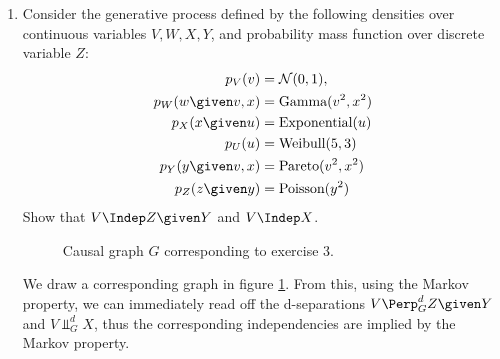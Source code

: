 \begin{enumerate}[label=6.\arabic*]
\begin{gradedsolution}
\begin{enumerate}
            \item
            In both cases, after the intervention $\doit(X=1)$, $X$ is distributed according to a delta distribution with its mass point on $X=1$. In the original Causal Bayesian Network, after intervention do$(X=1)$, the marginal distribution of $Y$ changes from $\mathcal{N}(-3,26)$ to $\mathcal{N}(2,1)$. However, in the inverted network, Intervention on $X$ does not change the distribution of $Y$ and so it is still distributed as $\mathcal{N}(-3,26)$.
        \end{enumerate}
    \end{gradedsolution}

    \item %
    Consider the generative process defined by the following densities over continuous variables $V, W, X, Y$, and probability mass function over discrete variable $Z$:
    \begin{align*}
        p_V(v)            & = \mathcal{N}(0,1),       \\
        p_W(w\given v, x) & = \text{Gamma}(v^2, x^2)  \\
        p_X(x\given u)    & = \text{Exponential}(u)   \\
        p_U(u)            & = \text{Weibull}(5,3)     \\
        p_Y(y\given v, x) & = \text{Pareto}(v^2, x^2) \\
        p_Z(z\given y)    & = \text{Poisson}(y^2)
    \end{align*}
    Show that $V \Indep Z \given Y$ and $V \Indep X$.

    \begin{ungradedsolution}
        \begin{figure}[ht]
            \centering
            \caption{Causal graph $G$ corresponding to exercise 3.}
            \label{fig:three}
        \end{figure}
        We draw a corresponding graph in figure \ref{fig:three}. From this, using the Markov property, we can immediately read off the d-separations $V \Perp^d_G Z \given Y$ and $V \Perp^d_G X$, thus the corresponding independencies are implied by the Markov property.
    \end{ungradedsolution}



\end{enumerate}

